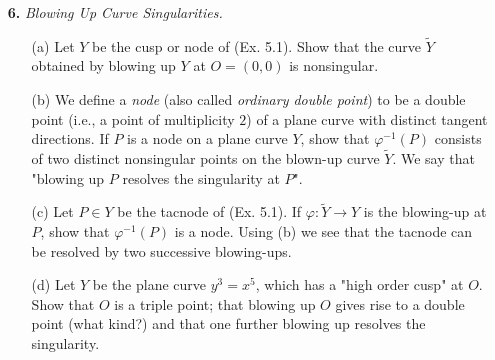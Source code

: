\documentclass[a4paper]{article}
\begin{document}
\begin{enumerate} [label=\textbf{\arabic*.}, leftmargin=0cm]
          \begin{proof} $ $ \vspace{0pt}
              \begin{itemize} [leftmargin=0cm]
                  \item[(a)] Let $f'$ be the polynomial $f(x, y)$ after change of coordinates so that $P$ becomes the origin and let $O = (0, 0)$ be the origin. Then, $P$ is a nonsingular point of $Y$ $\Leftrightarrow$ $(\partial f / \partial x)(P), ~ (\partial f / \partial y)(P) \neq 0$ $\Leftrightarrow$ $(\partial f' / \partial x)(O), ~ (\partial f' / \partial y)(O) \neq 0$ $\Leftrightarrow$ $\partial f' / \partial x, ~ \partial f' / \partial y = \text{higher degree terms} + \text{constant}$ $\Leftrightarrow$ $f'$ has linear terms $\Leftrightarrow$ $\mu_P(Y) = 1$.

                  \item[(b)] (a), (b), and (c) has multiplicity $2$, and (d) has multiplicity $3$ at $O$.
              \end{itemize}
          \end{proof}
          \filbreak

    \item[\textbf{6.}] \textit{Blowing Up Curve Singularities.}
          \begin{itemize}
              \item[(a)] Let $Y$ be the cusp or node of (Ex. 5.1).
                    Show that the curve $\widetilde{Y}$ obtained by blowing up $Y$ at $O = (0, 0)$ is nonsingular.

              \item[(b)] We define a \textit{node} (also called \textit{ordinary double point}) to be a double point (i.e., a point of multiplicity $2$) of a plane curve with distinct tangent directions.
                    If $P$ is a node on a plane curve $Y$, show that $\varphi^{-1}(P)$ consists of two distinct nonsingular points on the blown-up curve $\widetilde{Y}$.
                    We say that "blowing up $P$ resolves the singularity at $P$".

              \item[(c)] Let $P \in Y$ be the tacnode of (Ex. 5.1).
                    If $\varphi : \widetilde{Y} \to Y$ is the blowing-up at $P$, show that $\varphi^{-1}(P)$ is a node.
                    Using (b) we see that the tacnode can be resolved by two successive blowing-ups.

              \item[(d)] Let $Y$ be the plane curve $y^3 = x^5$, which has a "high order cusp" at $O$.
                    Show that $O$ is a triple point; that blowing up $O$ gives rise to a double point (what kind?) and that one further blowing up resolves the singularity.
          \end{itemize}


\end{enumerate}
\end{document}
